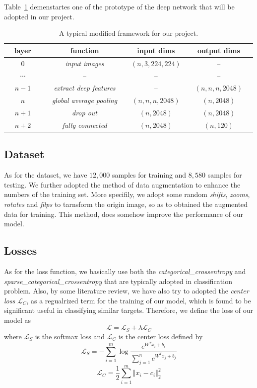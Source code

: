 \documentclass{article}
\begin{document}
Table~\ref{tab:1} demenstartes one of the prototype of the deep network that will be adopted in our project. 

\begin{table}[h]
	\centering
	\caption{A typical modified framework for our project.}
	\label{tab:1}
	\begin{tabular}{ccc|ccccccc}
		\toprule
		& layer &&& function && input dims && output dims & \\ 
		\midrule
		& $0$ &&& \emph{input images} && $(n, 3, 224, 224)$ && -- & \\ 
		& $\cdots$ &&& -- && -- && -- & \\
		& $n-1$ &&& \emph{extract deep features} && -- && $(n, n, n, 2048)$  & \\ 
		\midrule
		& $n$ &&& \emph{global average pooling} && $(n,n,n, 2048)$ && $(n, 2048)$ & \\ 
		& $n+1$ &&& \emph{drop out} && $(n, 2048)$ && $(n, 2048)$ & \\ 
		& $n+2$ &&& \emph{fully connected} && $(n, 2048)$  && $(n, 120)$ & \\ 
		\bottomrule
	\end{tabular}
\end{table}
\subsection{Dataset}
As for the dataset, we have $12,000$ samples for training and $8,580$ samples for testing. We further adopted the method of data augmentation to enhance the numbers of the training set. More specifily, we adopt some random \emph{shifts}, \emph{zooms}, \emph{rotates} and \emph{filps} to tarnsform the origin image, so as to obtained the augmented data for training. This method, does somehow improve the performance of our model. 
\subsection{Losses}
As for the loss function, we basically use both the \emph{categorical\_crossentropy} and \emph{sparse\_categorical\_crossentropy} that are typically adopted in classification problem. 
Also, by some literature review, we have also try to adopted the \emph{center loss} $\mathcal{L}_C$, as a regualrized term for the training of our model, which is found to be significant useful in classifying similar targets. Therefore, we define the loss of our model as
\begin{equation}
\mathcal{L}  =  \mathcal{L}_S + \lambda \mathcal{L}_C 
\end{equation} 
where $\mathcal{L}_S$ is the softmax loss and $\mathcal{L}_C$ is the center loss defined by
\begin{equation}
	\mathcal{L}_S = - \sum_{i=1}^{m} \log  \frac{e^{W^T x_i + b_{i}}}{\sum_{j=1}^{n} e^{W^T x_j + b_{j} }} 
\end{equation}
\begin{equation}
	\mathcal{L}_C = \frac{1}{2} \sum_{i=1}^{m} \left\Vert x_i - c_i\right\Vert^2_2
\end{equation}
\end{document}
